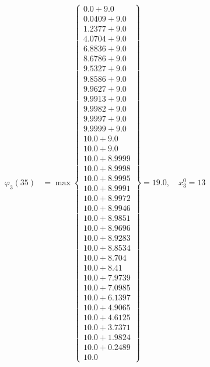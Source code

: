 \documentclass{article}
\begin{document}
\begin{align*}
  
\varphi_{3}(35) &= \max \left\{ \begin{array}{c}
0.0 + 9.0 \\
 0.0409 + 9.0 \\
 1.2377 + 9.0 \\
 4.0704 + 9.0 \\
 6.8836 + 9.0 \\
 8.6786 + 9.0 \\
 9.5327 + 9.0 \\
 9.8586 + 9.0 \\
 9.9627 + 9.0 \\
 9.9913 + 9.0 \\
 9.9982 + 9.0 \\
 9.9997 + 9.0 \\
 9.9999 + 9.0 \\
 10.0 + 9.0 \\
 10.0 + 9.0 \\
 10.0 + 8.9999 \\
 10.0 + 8.9998 \\
 10.0 + 8.9995 \\
 10.0 + 8.9991 \\
 10.0 + 8.9972 \\
 10.0 + 8.9946 \\
 10.0 + 8.9851 \\
 10.0 + 8.9696 \\
 10.0 + 8.9283 \\
 10.0 + 8.8534 \\
 10.0 + 8.704 \\
 10.0 + 8.41 \\
 10.0 + 7.9739 \\
 10.0 + 7.0985 \\
 10.0 + 6.1397 \\
 10.0 + 4.9065 \\
 10.0 + 4.6125 \\
 10.0 + 3.7371 \\
 10.0 + 1.9824 \\
 10.0 + 0.2489 \\
 10.0
\end{array} \right\}=19.0,\quad x_{3}^0=13\\
  
  
  

\end{align*}
\end{document}
